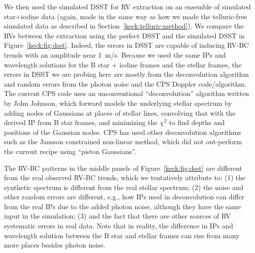 We then used the simulated DSST for RV extraction on an ensemble of
simulated star$+$iodine data (again, made in the same way as how we
made the telluric-free simulated data as described in
Section~\ref{keck:telluric:method}). We compare the RVs between the
extraction using the perfect DSST and the simulated DSST in
Figure~\ref{keck:fig:dsst}. Indeed, the errors in DSST are capable of
inducing RV-BC trends with an amplitude near 1~m/s. Because we used
the same IPs and wavelength solutions for the B star $+$ iodine frames
and the stellar frames, the errors in DSST we are probing here are
mostly from the deconvolution algorithm and random errors from the
photon noise and the CPS Doppler code/algorithm. The current CPS code
uses an unconventional ``deconvolution'' algorithm written by John
Johnson, which forward models the underlying stellar spectrum by
adding nodes of Gaussians at places of stellar lines, convolving that
with the derived IP from B star frames, and minimizing the $\chi^2$ to
find depths and positions of the Gaussian nodes. CPS has used other
deconvolution algorithms such as the Jansson constrained non-linear
method, which did not out-perform the current recipe using ``piston
Gaussians''.

The RV-BC patterns in the middle panels of Figure~\ref{keck:fig:dsst}
are different from the real observed RV-BC trends, which we
tentatively attribute to: (1) the synthetic spectrum is different from
the real stellar spectrum; (2) the noise and other random errors are
different, e.g., how IPs used in deconvolution can differ from the
real IPs due to the added photon noise, although they have the same
input in the simulation; (3) and the fact that there are other sources
of RV systematic errors in real data. Note that in reality, the
difference in IPs and wavelength solution between the B star and
stellar frames can rise from many more places besides photon noise.


